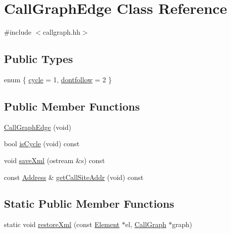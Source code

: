 \hypertarget{class_call_graph_edge}{}\section{Call\+Graph\+Edge Class Reference}
\label{class_call_graph_edge}


{\ttfamily \#include $<$callgraph.\+hh$>$}

\subsection*{Public Types}
\begin{DoxyCompactItemize}
\item 
enum \{ \mbox{\hyperlink{class_call_graph_edge_ae0c626c4a0f80a97f33acf82cc6462b7aff8d8d4892536224bd984531ddc12a92}{cycle}} = 1, 
\mbox{\hyperlink{class_call_graph_edge_ae0c626c4a0f80a97f33acf82cc6462b7afee733c96c0a8debd4dbf994feaa10c7}{dontfollow}} = 2
 \}
\end{DoxyCompactItemize}
\subsection*{Public Member Functions}
\begin{DoxyCompactItemize}
\item 
\mbox{\hyperlink{class_call_graph_edge_aa8a22494ac517656afcf05e5e6a1598e}{Call\+Graph\+Edge}} (void)
\item 
bool \mbox{\hyperlink{class_call_graph_edge_a5d3d7832cb31183a683927c5cf099a61}{is\+Cycle}} (void) const
\item 
void \mbox{\hyperlink{class_call_graph_edge_a78d99c85c0715d1f8bab9f898e6fc2d5}{save\+Xml}} (ostream \&s) const
\item 
const \mbox{\hyperlink{class_address}{Address}} \& \mbox{\hyperlink{class_call_graph_edge_a4f340cece8e49d9ec0a5907d8bed9936}{get\+Call\+Site\+Addr}} (void) const
\end{DoxyCompactItemize}
\subsection*{Static Public Member Functions}
\begin{DoxyCompactItemize}
\item 
static void \mbox{\hyperlink{class_call_graph_edge_ab1136dde3188c5d224fbfb33ecc7cda7}{restore\+Xml}} (const \mbox{\hyperlink{class_element}{Element}} $\ast$el, \mbox{\hyperlink{class_call_graph}{Call\+Graph}} $\ast$graph)
\end{DoxyCompactItemize}
